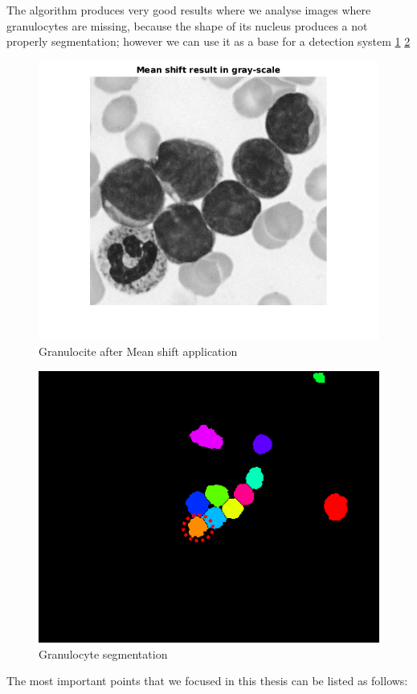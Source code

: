 The algorithm produces very good results where we analyse images where granulocytes are missing, because the shape of its nucleus produces a not properly segmentation; however we can use it as a base for a detection system \ref{fig:grangray} \ref{fig:gran}
\begin{figure}
\begin{center}
		\includegraphics[scale=0.5]{img/final/meangran.png}
		\caption{Granulocite after Mean shift application}
		\label{fig:grangray}
\end{center}
\end{figure}
\begin{figure}
\begin{center}
		\includegraphics[scale=0.5]{img/final/fingran1.png}
		\caption{Granulocyte segmentation}
		\label{fig:gran}
\end{center}
\end{figure}
The most important points that we focused in this thesis can be listed as follows:
\bigskip

